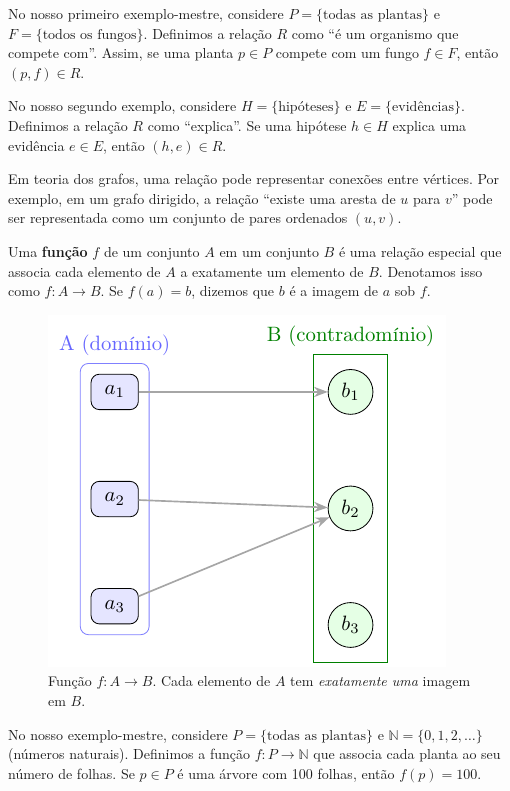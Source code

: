 No nosso primeiro exemplo-mestre, considere \(P=\{\text{todas as plantas}\}\) e \(F=\{\text{todos os fungos}\}\). Definimos a relação \(R\) como ``é um organismo que compete com''. Assim, se uma planta \(p \in P\) compete com um fungo \(f \in F\), então \((p,f) \in R\).


No nosso segundo exemplo, considere \(H=\{\text{hipóteses}\}\) e \(E=\{\text{evidências}\}\). Definimos a relação \(R\) como ``explica''. Se uma hipótese \(h \in H\) explica uma evidência \(e \in E\), então \((h,e) \in R\).


Em teoria dos grafos, uma relação pode representar conexões entre vértices. Por exemplo, em um grafo dirigido, a relação ``existe uma aresta de \(u\) para \(v\)'' pode ser representada como um conjunto de pares ordenados \((u,v)\).


Uma \textbf{função} \(f\) de um conjunto \(A\) em um conjunto \(B\) é uma relação especial que associa cada elemento de \(A\) a exatamente um elemento de \(B\). Denotamos isso como \(f: A \to B\). Se \(f(a) = b\), dizemos que \(b\) é a imagem de \(a\) sob \(f\).


\begin{figure}[H]
	\centering
	\includegraphics[width=0.9\linewidth]{figures/fig_funcao.pdf}

	\caption{Função $f\!:\!A\to B$. Cada elemento de $A$ tem \emph{exatamente uma} imagem em $B$.}
	\label{fig:funcao}
\end{figure}



No nosso exemplo-mestre, considere \(P=\{\text{todas as plantas}\}\) e \(\mathbb{N}=\{0,1,2,\ldots\}\) (números naturais). Definimos a função \(f: P \to \mathbb{N}\) que associa cada planta ao seu número de folhas. Se \(p \in P\) é uma árvore com 100 folhas, então \(f(p) = 100\).


